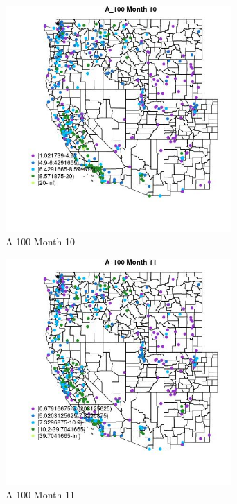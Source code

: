 \begin{figure} 
\centering  
\includegraphics[width=0.77\textwidth]{Code_Outputs/ML_input_report_ML_input_PM25_Step5_part_d_de_duplicated_aves_ML_input_MapObsMo10A_100.jpg} 
\caption{\label{fig:ML_input_report_ML_input_PM25_Step5_part_d_de_duplicated_aves_ML_inputMapObsMo10A_100}A-100 Month 10} 
\end{figure} 
 

\begin{figure} 
\centering  
\includegraphics[width=0.77\textwidth]{Code_Outputs/ML_input_report_ML_input_PM25_Step5_part_d_de_duplicated_aves_ML_input_MapObsMo11A_100.jpg} 
\caption{\label{fig:ML_input_report_ML_input_PM25_Step5_part_d_de_duplicated_aves_ML_inputMapObsMo11A_100}A-100 Month 11} 
\end{figure} 
 

